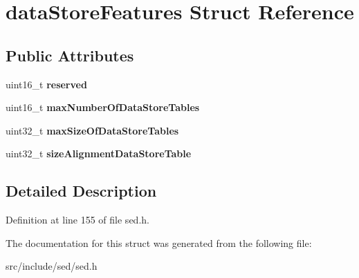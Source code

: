 \hypertarget{structdataStoreFeatures}{}\section{data\+Store\+Features Struct Reference}
\label{structdataStoreFeatures}
\subsection*{Public Attributes}
\begin{DoxyCompactItemize}
\item 
\hypertarget{structdataStoreFeatures_a421b60287e47ee2448762d37b6acf133}{}uint16\+\_\+t {\bfseries reserved}\label{structdataStoreFeatures_a421b60287e47ee2448762d37b6acf133}

\item 
\hypertarget{structdataStoreFeatures_a7431635d648eec79a383059af40424e0}{}uint16\+\_\+t {\bfseries max\+Number\+Of\+Data\+Store\+Tables}\label{structdataStoreFeatures_a7431635d648eec79a383059af40424e0}

\item 
\hypertarget{structdataStoreFeatures_a83e5eb8068b3f293e376810d9dab10bb}{}uint32\+\_\+t {\bfseries max\+Size\+Of\+Data\+Store\+Tables}\label{structdataStoreFeatures_a83e5eb8068b3f293e376810d9dab10bb}

\item 
\hypertarget{structdataStoreFeatures_a438b530cf16d94133a9d641d33ac28dd}{}uint32\+\_\+t {\bfseries size\+Alignment\+Data\+Store\+Table}\label{structdataStoreFeatures_a438b530cf16d94133a9d641d33ac28dd}

\end{DoxyCompactItemize}


\subsection{Detailed Description}


Definition at line 155 of file sed.\+h.



The documentation for this struct was generated from the following file\+:\begin{DoxyCompactItemize}
\item 
src/include/sed/sed.\+h\end{DoxyCompactItemize}
